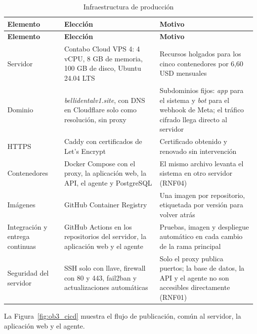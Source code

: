 \begingroup
\fontsize{9}{11}\selectfont
\renewcommand{\arraystretch}{1.2}
\setlength{\LTpre}{0pt}\setlength{\LTpost}{6pt}
\setlength{\tabcolsep}{4pt}
\begin{xltabular}{\linewidth}{|>{\raggedright\arraybackslash}p{2.8cm}|>{\raggedright\arraybackslash}p{5.0cm}|>{\raggedright\arraybackslash}X|}
\caption{Infraestructura de producción}
\label{tab:ob3_infraestructura} \\
\hline
\textbf{Elemento} & \textbf{Elección} & \textbf{Motivo} \\ \hline
\endfirsthead
\hline
\textbf{Elemento} & \textbf{Elección} & \textbf{Motivo} \\ \hline
\endhead
Servidor & Contabo Cloud VPS 4: 4 vCPU, 8 GB de memoria, 100 GB de disco, Ubuntu 24.04 LTS & Recursos holgados para los cinco contenedores por 6,60 USD mensuales \\ \hline
Dominio & \textit{bellidentalv1.site}, con DNS en Cloudflare solo como resolución, sin proxy & Subdominios fijos: \textit{app} para el sistema y \textit{bot} para el webhook de Meta; el tráfico cifrado llega directo al servidor \\ \hline
HTTPS & Caddy con certificados de Let's Encrypt & Certificado obtenido y renovado sin intervención \\ \hline
Contenedores & Docker Compose con el proxy, la aplicación web, la API, el agente y PostgreSQL & El mismo archivo levanta el sistema en otro servidor (RNF04) \\ \hline
Imágenes & GitHub Container Registry & Una imagen por repositorio, etiquetada por versión para volver atrás \\ \hline
Integración y entrega continuas & GitHub Actions en los repositorios del servidor, la aplicación web y el agente & Pruebas, imagen y despliegue automático en cada cambio de la rama principal \\ \hline
Seguridad del servidor & SSH solo con llave, firewall con 80 y 443, fail2ban y actualizaciones automáticas & Solo el proxy publica puertos; la base de datos, la API y el agente no son accesibles directamente (RNF01) \\ \hline
\end{xltabular}
\endgroup

La Figura~\ref{fig:ob3_cicd} muestra el flujo de publicación, común al servidor, la aplicación web y el agente.


